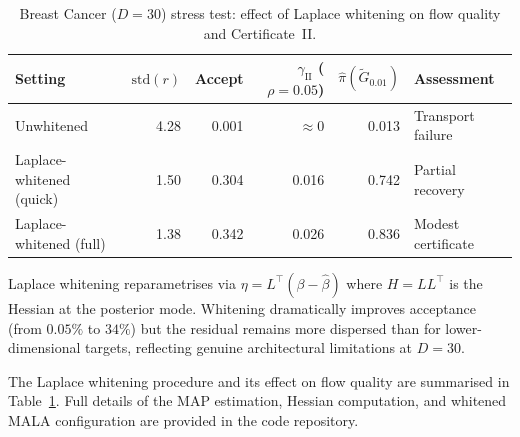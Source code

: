 \documentclass[12pt]{article}
\begin{document}
\begin{table}[h]
\centering
\caption{Breast Cancer ($D=30$) stress test: effect of Laplace whitening on flow quality and Certificate~II.}
\label{tab:whitening}
\begin{tabular}{lrrrrl}
\toprule
Setting & $\mathrm{std}(r)$ & Accept & $\gamma_{\mathrm{II}}$ ($\rho\!=\!0.05$) & $\hat{\pi}(\tilde{G}_{0.01})$ & Assessment \\
\midrule
Unwhitened              & 4.28 & 0.001 & $\approx 0$ & 0.013 & Transport failure \\
Laplace-whitened (quick) & 1.50 & 0.304 & 0.016       & 0.742 & Partial recovery \\
Laplace-whitened (full)  & 1.38 & 0.342 & 0.026       & 0.836 & Modest certificate \\
\bottomrule
\end{tabular}

\smallskip
\begin{minipage}{\linewidth}
\small Laplace whitening reparametrises via $\eta = L^\top(\beta - \hat{\beta})$ where $H = LL^\top$ is the Hessian at the posterior mode. Whitening dramatically improves acceptance (from $0.05\%$ to $34\%$) but the residual remains more dispersed than for lower-dimensional targets, reflecting genuine architectural limitations at $D = 30$.
\end{minipage}
\end{table}

The Laplace whitening procedure and its effect on flow quality are summarised in Table~\ref{tab:whitening}. Full details of the MAP estimation, Hessian computation, and whitened MALA configuration are provided in the code repository.
\end{document}
